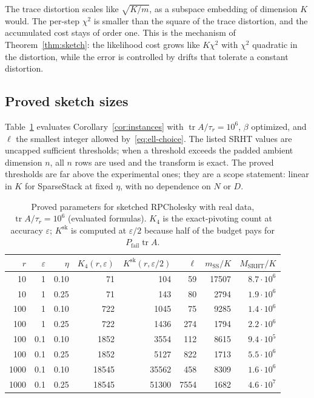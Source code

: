 \documentclass[11pt]{article}
\theoremstyle{definition}\newtheorem{definition}[theorem]{Definition}
\theoremstyle{remark}\newtheorem{remark}[theorem]{Remark}
\newcommand{\eps}{\varepsilon}
\newcommand{\tr}{\operatorname{tr}}
\newcommand{\1}{\mathbf 1}
\newcommand{\Pfail}{P_{\mathrm{fail}}}
\begin{document}
The trace distortion scales like $\sqrt{K/m}$, as a subspace embedding
of dimension $K$ would. The per-step $\chi^2$ is smaller than the
square of the trace distortion, and the accumulated cost stays of order
one. This is the mechanism of Theorem~\ref{thm:sketch}: the likelihood
cost grows like $K\chi^2$ with $\chi^2$ quadratic in the distortion,
while the error is controlled by drifts that tolerate a constant
distortion.

\subsection{Proved sketch sizes}
Table~\ref{tab:sk-params} evaluates Corollary~\ref{cor:instances} with
$\tr A/\tau_r=10^6$, $\beta$ optimized, and $\ell$ the smallest integer
allowed by~\eqref{eq:ell-choice}. The listed SRHT values are uncapped
sufficient thresholds; when a threshold exceeds the padded ambient
dimension $n$, all $n$ rows are used and the transform is exact.
The proved thresholds are far above the
experimental ones; they are a scope statement: linear in $K$ for
SparseStack at fixed $\eta$, with no dependence on $N$ or $D$.

\begin{table}[ht]
\centering
\begin{tabular}{rrrrrrrr}
\toprule
$r$ & $\eps$ & $\eta$ & $K_4(r,\eps)$ & $K^{\mathrm{sk}}(r,\eps/2)$ & $\ell$ & $m_{\mathrm{SS}}/K$ & $M_{\mathrm{SRHT}}/K$\\
\midrule
10 & 1 & 0.10 & 71 & 104 & 59 & 17507 & $8.7\cdot10^6$\\
10 & 1 & 0.25 & 71 & 143 & 80 & 2794 & $1.9\cdot10^6$\\
100 & 1 & 0.10 & 722 & 1045 & 75 & 9285 & $1.4\cdot10^6$\\
100 & 1 & 0.25 & 722 & 1436 & 274 & 1794 & $2.2\cdot10^6$\\
100 & 0.1 & 0.10 & 1852 & 3554 & 112 & 8615 & $9.4\cdot10^5$\\
100 & 0.1 & 0.25 & 1852 & 5127 & 822 & 1713 & $5.5\cdot10^6$\\
1000 & 0.1 & 0.10 & 18545 & 35562 & 458 & 8309 & $1.6\cdot10^6$\\
1000 & 0.1 & 0.25 & 18545 & 51300 & 7554 & 1682 & $4.6\cdot10^7$\\
\bottomrule
\end{tabular}
\caption{Proved parameters for sketched RPCholesky with real data,
$\tr A/\tau_r=10^6$ (evaluated formulas). $K_4$ is the exact-pivoting
count at accuracy $\eps$; $K^{\mathrm{sk}}$ is computed at $\eps/2$
because half of the budget pays for $\Pfail\tr A$.}
\label{tab:sk-params}
\end{table}
\end{document}
